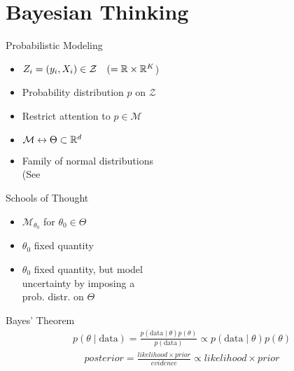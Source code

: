 \section{Bayesian Thinking}

\begin{frame}{Probabilistic Modeling}
  \Large{
  \begin{itemize}
    \item[]  $Z_i = (y_i, X_i) \in \mathcal{Z} \quad (=\mathbb{R} \times \mathbb{R}^K$)\pause
    \item[]  Probability distribution $p$ on $\mathcal{Z}$\pause
    \item[]  Restrict attention to $p \in \mathcal{M}$\pause
    \item[]  $\mathcal{M} \leftrightarrow \Theta \subset \mathbb{R}^d$\pause
    \item[]  Family of normal distributions\pause\\
    \quad\quad\quad\quad (See \pause {}
  \end{itemize}
  }
\end{frame}

\begin{frame}{Schools of Thought}
  \Large{
  \begin{itemize}
    \item[]  $\mathcal{M}_{\theta_0}$ for $\theta_0 \in \Theta$\pause
    \item[]  $\theta_0$ fixed quantity\pause
    \item[]  $\theta_0$ fixed quantity\pause, but model\\
    \quad\quad\quad\quad uncertainty by imposing a\\
    \quad\quad\quad\quad prob. distr. on $\Theta$
  \end{itemize}
  }
\end{frame}

\begin{frame}{Bayes' Theorem}
  \Large{
    \begin{align*}
      p(\theta \mid \text{data}) = \frac{p(\text{data} \mid \theta) p(\theta)}{p(\text{data})} \propto p(\text{data} \mid \theta) p(\theta)
    \end{align*}\pause
    \vfill
    \begin{align*}
      posterior = \frac{likelihood \times prior}{evidence} \propto likelihood \times prior
    \end{align*}
  }
\end{frame}

